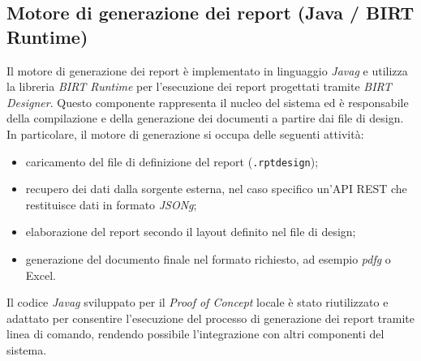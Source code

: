 \subsection{Motore di generazione dei report (Java / BIRT Runtime)}
Il motore di generazione dei report è implementato in linguaggio \emph{\gls{Javag}} e utilizza la libreria \textit{BIRT Runtime} per l'esecuzione dei report progettati tramite \textit{BIRT Designer}. Questo componente rappresenta il nucleo del sistema ed è responsabile della compilazione e della generazione dei documenti a partire dai file di design.
In particolare, il motore di generazione si occupa delle seguenti attività:
\begin{itemize}
    \item caricamento del file di definizione del report (\texttt{.rptdesign});
    \item recupero dei dati dalla sorgente esterna, nel caso specifico un'API REST che restituisce dati in formato \emph{\gls{JSONg}};
    \item elaborazione del report secondo il layout definito nel file di design;
    \item generazione del documento finale nel formato richiesto, ad esempio \emph{\gls{pdfg}} o Excel.
\end{itemize}
Il codice \emph{\gls{Javag}} sviluppato per il \textit{Proof of Concept} locale è stato riutilizzato e adattato per consentire l'esecuzione del processo di generazione dei report tramite linea di comando, rendendo possibile l'integrazione con altri componenti del sistema.

